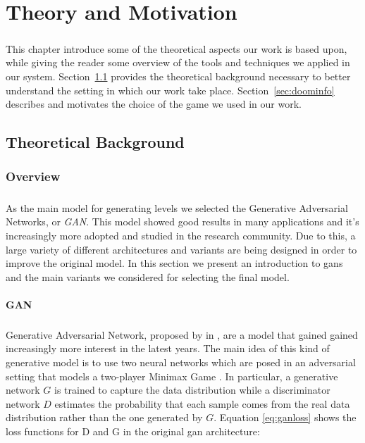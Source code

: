 \chapter{Theory and Motivation}
\label{ch:theory}
\paragraph{} This chapter introduce some of the theoretical aspects our work is based upon, while giving the reader some overview of the tools and techniques we applied in our system. Section~\ref{sec:gantheory} provides the theoretical background necessary to better understand the setting in which our work take place. Section~\ref{sec:doominfo} describes and motivates the choice of the game we used in our work. 

\section{Theoretical Background}
\label{sec:gantheory}
\subsection{Overview}
\paragraph{} As the main model for generating levels we selected the Generative Adversarial Networks, or \textit{GAN}. This model showed good results in many applications and it's increasingly more adopted and studied in the research community. Due to this, a large variety of different architectures and variants are being designed in order to improve the original model. In this section we present an introduction to \glspl{gan} and the main variants we considered for selecting the final model. 

\subsubsection{GAN}
\label{sec:introgan}
\paragraph{} Generative Adversarial Network, proposed by \citeauthor{gan}  \cite{gan} in \citeyear{gan}, are a model that gained gained increasingly more interest in the latest years. The main idea of this kind of generative model is to use two neural networks which are posed in an adversarial setting that models a two-player Minimax Game \cite[p.~276]{minimax}. In particular, a generative network $G$ is trained to capture the data distribution while a discriminator network $D$ estimates the probability that each sample comes from the real data distribution rather than the one generated by $G$. 
Equation \ref{eq:ganloss} shows the loss functions for D and G in the original \gls{gan} architecture\cite{gan}:

